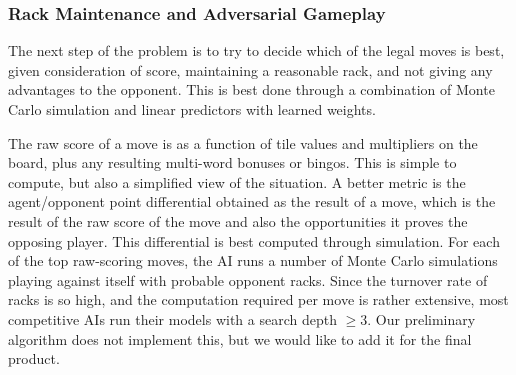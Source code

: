\documentclass[12pt]{article}
\begin{document}


\subsubsection*{Rack Maintenance and Adversarial Gameplay}
The next step of the problem is to try to decide which of the legal
moves is best, given consideration of score, maintaining a reasonable
rack, and not giving any advantages to the opponent. This is best done
through a combination of Monte Carlo simulation and linear predictors
with learned weights.

The raw score of a move is as a function of tile values and
multipliers on the board, plus any resulting multi-word bonuses or
bingos. This is simple to compute, but also a simplified view of the
situation. A better metric is the agent/opponent point differential
obtained as the result of a move, which is the result of the raw score
of the move and also the opportunities it proves the opposing
player. This differential is best computed through simulation. For
each of the top raw-scoring moves, the AI runs a number of Monte Carlo
simulations playing against itself with probable opponent racks. Since
the turnover rate of racks is so high, and the computation required
per move is rather extensive, most competitive AIs run their models
with a search depth $\geq 3$. Our preliminary algorithm does not
implement this, but we would like to add it for the final product.
\end{document}
